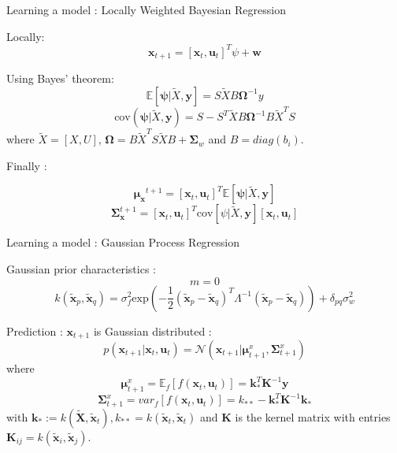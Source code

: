 \documentclass[10pt]{beamer}
\begin{document}
\begin{frame}{Learning a model : Locally Weighted Bayesian Regression }
\begin{exampleblock}{Locally:}
$$\bm{x}_{t+1}= [\bm{x}_{t},\bm{u}_{t}]^T \psi + \bm{w}$$

Using Bayes' theorem: 
$$
\mathbb{E} [ \bm{\psi}| \widetilde{X},\bm{y} ] =S \widetilde{X}B \bm{\Omega}^{-1}y $$
$$
\text{cov}(\bm{\psi}| \widetilde{X},\bm{y}) =S -S^T\widetilde{X}B\bm{\Omega}^{-1}B\widetilde{X}^TS
$$
where $\widetilde{X}=[X,U]$, $\bm{\Omega} =B\widetilde{X}^TS\widetilde{X}B+\bm{\Sigma}_w$ and $B=diag(b_i)$.
\end{exampleblock}

\begin{alertblock}{Finally :}


$$
\bm{\mu_{x}}^{t+1}=[\bm{x}_t,\bm{u}_t]^T\mathbb{E} [ \bm{\psi}| \widetilde{X},\bm{y}]
$$ 
$$
 \bm{\Sigma}_{\bm{x}}^{t+1}=[\bm{x}_t,\bm{u}_t]^T\text{cov} [ \psi| \widetilde{X},\bm{y}][\bm{x}_t,\bm{u}_t]
$$
\end{alertblock}
\end{frame}

\begin{frame}{Learning a model : Gaussian Process Regression }

\begin{exampleblock}{Gaussian prior characteristics :} 
$$
m=0
$$
$$
k({\widetilde { \bm{x} }}_{ p } , { \widetilde {\bm{x}} }_{ q })={ \sigma  }_{ f }^{ 2 }\text{exp}(-\frac { 1 }{ 2 } ({ \widetilde {\bm{x}} }_{ p } -{\widetilde {\bm{ x}} }_{ q }) ^{ T }{ \Lambda  }^{ -1 }({ \widetilde {\bm{x}} }_{ p }  - \widetilde {\bm{x} }_{ q }) ) +{ \delta  }_{ pq }{ \sigma  }_{ w }^{ 2 }
$$
\end{exampleblock}
\begin{alertblock}{Prediction :}
 $\bm{x}_{t+1}$ is Gaussian distributed : 
$$
p({ \bm{x} }_{ t+1 }|{\bm{ x} }_{ t },{ \bm{u} }_{ t })=\mathcal{ N }({ \bm{x} }_{ t+1 }|{ \bm{\mu}  }_{ t+1 }^{ x },{ \bm{\Sigma}  }_{ t+1 }^{ x })
$$
where $${ \bm{\mu}  }_{ t+1 }^{ x }= {\mathbb{E}}_{f}[f(\bm{x}_t,\bm{u}_t)]= \bm{k}_{*}^{T}\bm{K}^{-1}\bm{y}$$ 
$${\bm{\Sigma}  }_{ t+1 }^{ x }={var}_{f}[f(\bm{x}_t,\bm{u}_t)]=k_{**}-\bm{k}_{*}^{T}\bm{K}^{-1}\bm{k}_{*}$$
with $\bm{k_*}:=k(\widetilde{\bm{X}},\widetilde{\bm{x}}_t), k_{**}=k(\widetilde{\bm{x}}_t,\widetilde{\bm{x}}_t)$ and $\bm{K}$ is the kernel matrix with entries $\bm{K}_{ij}= k(\widetilde{\bm{x}}_i,\widetilde{\bm{x}}_j)$.
\end{alertblock}
\end{frame}
\end{document}
